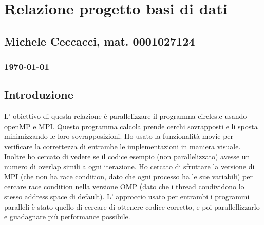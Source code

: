 \documentclass[a4paper,11pt, twoside]{report}
\begin{document}
\section*{Relazione progetto basi di dati}
\subsection*{Michele Ceccacci, mat. 0001027124}
\subsubsection*{\today}

\subsection*{Introduzione}
L' obiettivo di questa relazione è parallelizzare il programma circles.c usando openMP e MPI. 
Questo programma calcola prende cerchi sovrapposti e li sposta minimizzando le loro sovrapposizioni.
Ho usato la funzionalità movie per verificare la correttezza di entrambe le implementazioni in maniera visuale. 
Inoltre ho cercato di vedere se il codice esempio (non parallelizzato) avesse un numero di overlap simili a ogni iterazione. Ho cercato di sfruttare la versione di MPI (che non ha race condition, dato che ogni processo ha le sue variabili) 
per cercare race condition nella versione OMP (dato che i thread condividono lo stesso address space di default). 
L' approccio usato per entrambi i programmi paralleli è stato quello di cercare di ottenere codice corretto,
e poi parallellizzarlo e guadagnare più performance possibile.
\end{document}
